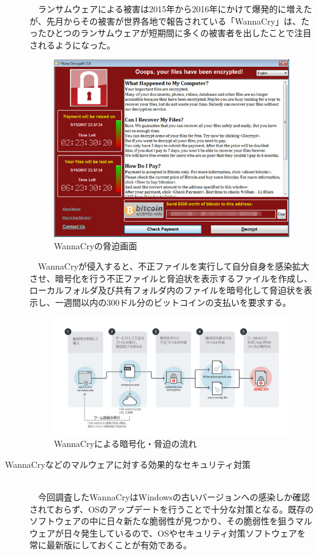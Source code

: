 \documentclass[a4paper,12pt]{jarticle}
\begin{document}
\begin{description}
　ランサムウェアによる被害は2015年から2016年にかけて爆発的に増えたが、先月からその被害が世界各地で報告されている「WannaCry」は、たったひとつのランサムウェアが短期間に多くの被害者を出したことで注目されるようになった。
  \begin{figure}[H]
   \begin{center}
    \includegraphics[width=100truemm]{WannaCry.jpg}
    \caption{WannaCryの脅迫画面}
    \label{WannaCryPicture}
   \end{center}
  \end{figure}
　WannaCryが侵入すると、不正ファイルを実行して自分自身を感染拡大させ、暗号化を行う不正ファイルと脅迫状を表示するファイルを作成し、ローカルフォルダ及び共有フォルダ内のファイルを暗号化して脅迫状を表示し、一週間以内の300ドル分のビットコインの支払いを要求する。
  \begin{figure}[H]
   \begin{center}
    \includegraphics[width=150truemm]{WannaCryFlow.jpg}
    \caption{WannaCryによる暗号化・脅迫の流れ}
    \label{WannaCryFlowPicture}
   \end{center}
  \end{figure}
 \item[WannaCryなどのマルウェアに対する効果的なセキュリティ対策]\mbox\\\\
　今回調査したWannaCryはWindowsの古いバージョンへの感染しか確認されておらず、OSのアップデートを行うことで十分な対策となる。既存のソフトウェアの中に日々新たな脆弱性が見つかり、その脆弱性を狙うマルウェアが日々発生しているので、OSやセキュリティ対策ソフトウェアを常に最新版にしておくことが有効である。
\end{description}
\end{document}
